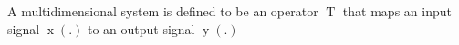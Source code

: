 A multidimensional system is defined to be an operator $\operatorname{T}$ that maps an input signal $\operatorname{x}(.)$ to an output signal $\operatorname{y}(.)$
